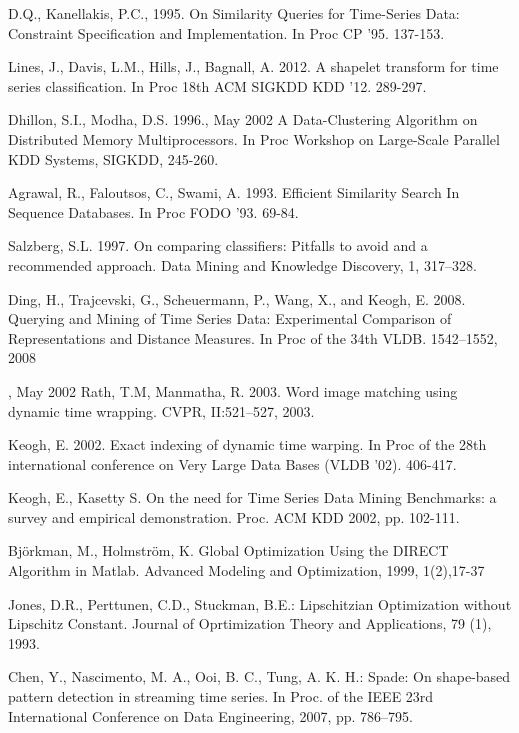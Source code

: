 \documentclass{llncs}
\begin{document}
\begin{thebibliography}{5}
D.Q., Kanellakis, P.C., 1995.
On Similarity Queries for Time-Series Data: Constraint Specification and Implementation. 
In Proc CP '95. 137-153.

Lines, J., Davis, L.M., Hills, J., Bagnall, A. 2012.
A shapelet transform for time series classification. 
In Proc 18th ACM SIGKDD KDD '12. 289-297.

Dhillon, S.I., Modha, D.S. 1996., May 2002
A Data-Clustering Algorithm on Distributed Memory Multiprocessors. 
In Proc Workshop on Large-Scale Parallel KDD Systems, SIGKDD, 245-260.

Agrawal, R., Faloutsos, C., Swami, A. 1993.
Efficient Similarity Search In Sequence Databases.
In Proc FODO '93. 69-84.

Salzberg, S.L. 1997.
On comparing classifiers: Pitfalls to avoid and a recommended approach. 
Data Mining and Knowledge Discovery, 1, 317–328.

Ding, H., Trajcevski, G., Scheuermann, P., Wang, X., and Keogh, E. 2008.
Querying and Mining of Time Series Data: Experimental Comparison of Representations and Distance
Measures. 
In Proc of the 34th VLDB. 1542–1552, 2008

, May 2002
Rath, T.M, Manmatha, R. 2003.
Word image matching using dynamic time wrapping. 
CVPR, II:521–527, 2003.

Keogh, E. 2002. 
Exact indexing of dynamic time warping. 
In Proc of the 28th international conference on Very Large Data Bases (VLDB '02). 406-417.

Keogh, E., Kasetty S. 
On the need for Time Series Data Mining Benchmarks: a survey and empirical demonstration.
Proc. ACM KDD 2002, pp. 102-111.

Björkman, M., Holmström, K.
Global Optimization Using the DIRECT Algorithm in Matlab.
Advanced Modeling and Optimization, 1999, 1(2),17-37

Jones, D.R., Perttunen, C.D., Stuckman, B.E.:
Lipschitzian Optimization without Lipschitz Constant.
Journal of Oprtimization Theory and Applications, 79 (1), 1993.

Chen, Y., Nascimento, M. A., Ooi, B. C., Tung, A. K. H.:
Spade: On shape-based pattern detection in streaming time series. 
In Proc. of the IEEE 23rd International Conference on Data Engineering, 2007, pp. 786–795.


\end{thebibliography}
\end{document}
